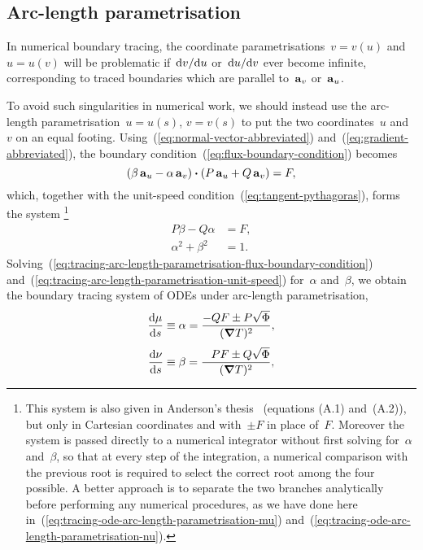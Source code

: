 \subsection{Arc-length parametrisation}
\label{sec:curvilinear.tracing.arc-length}

In numerical boundary tracing,
the coordinate parametrisations~$v = v (u)$ and~$u = u (v)$
will be problematic
if~$\mathop{}\!\mathrm{d} v / {\mathop{}\!\mathrm{d} u}$ or~$\mathop{}\!\mathrm{d} u / {\mathop{}\!\mathrm{d} v}$ ever become infinite,
corresponding to traced boundaries
which are parallel to~$\mathop{}\!\boldsymbol{\mathbf{a}}_{v}$ or~$\mathop{}\!\boldsymbol{\mathbf{a}}_{u}$.

To avoid such singularities in numerical work, we should instead use
the arc-length parametrisation~$u = u (s)$, $v = v(s)$
to put the two coordinates~$u$ and~$v$ on an equal footing.
Using~(\ref{eq:normal-vector-abbreviated})
and~(\ref{eq:gradient-abbreviated}),
the boundary condition~(\ref{eq:flux-boundary-condition}) becomes
\[
  \roundbr[\bulkysize]{\beta \basisvec{u} - \alpha \basisvec{v}}
    \dotp
  \roundbr[\bulkysize]{P \basisvec{u} + Q \basisvec{v}}
    =
  F,
\]
which, together with the unit-speed condition~(\ref{eq:tangent-pythagoras}),
forms the system%
\footnote{
  This system is also given
  in Anderson's thesis~\cite{anderson-2002-thesis-boundary-tracing-pdes}
  (equations (A.1) and~(A.2)),
  but only in Cartesian coordinates
  and with~$\pm F$ in place of~$F$.
  Moreover the system is passed directly to a numerical integrator
  without first solving for~$\alpha$ and~$\beta$,
  so that at every step of the integration,
  a numerical comparison with the previous root
  is required to select the correct root among the four possible.
  A better approach is to separate the two branches analytically
  before performing any numerical procedures,
  as we have done here
  in~(\ref{eq:tracing-ode-arc-length-parametrisation-mu})
  and~(\ref{eq:tracing-ode-arc-length-parametrisation-nu}).
}
\begin{align}
  P \beta - Q \alpha &= F,
    \label{eq:tracing-arc-length-parametrisation-flux-boundary-condition} \\
  \alpha^2 + \beta^2 &= 1.
    \label{eq:tracing-arc-length-parametrisation-unit-speed}
\end{align}
Solving~(\ref{eq:tracing-arc-length-parametrisation-flux-boundary-condition})
and~(\ref{eq:tracing-arc-length-parametrisation-unit-speed})
for~$\alpha$ and~$\beta$, we obtain
the boundary tracing system of ODEs under arc-length parametrisation,
\begin{align}
  \tder{\mu}{s} &\ideq \alpha = \frac{-Q F \pm P \sqrt{\Phi}}{(\del T)^2},
    \label{eq:tracing-ode-arc-length-parametrisation-mu} \\[\tallspace]
  \tder{\nu}{s} &\ideq \beta = \frac{\+P F \pm Q \sqrt{\Phi}}{(\del T)^2},
    \label{eq:tracing-ode-arc-length-parametrisation-nu}
\end{align}
